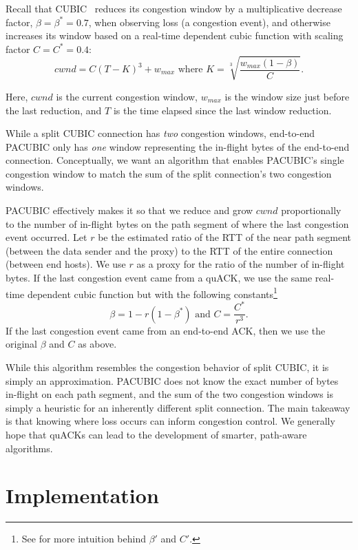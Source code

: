 Recall that CUBIC~\cite{ha2008cubic} reduces its congestion window by a
multiplicative decrease factor,
$\beta = \beta^* = 0.7$, when observing loss (a congestion event), and otherwise increases
its window based on a real-time dependent cubic function with scaling factor
$C=C^*=0.4$:
\[
cwnd = C(T-K)^3 + w_{max} \text{ where } K = \sqrt[3]{\frac{w_{max}(1-\beta)}{C}}.
\]

\noindent Here, $cwnd$ is the current congestion window,
$w_{max}$ is the window size just before the last reduction,
and $T$ is the time elapsed since the last window reduction.

While a split CUBIC connection has \emph{two} congestion windows,
end-to-end PACUBIC only has \emph{one} window representing the in-flight bytes
of the end-to-end connection.
Conceptually, we want an algorithm that enables PACUBIC's single
congestion window to match the sum of the split connection's two congestion
windows.

PACUBIC effectively makes it so that we reduce and grow $cwnd$
proportionally to the number of in-flight bytes on the path segment
of where the last congestion event occurred.
Let $r$ be the estimated ratio of the RTT of the near path segment
(between the data sender and the proxy) to the RTT of the entire connection
(between end hosts).
We use $r$ as a proxy for the ratio of the number of in-flight bytes.
If the last congestion event came from a quACK, we use the same real-time
dependent cubic function but with the following
constants\footnote{See  for more intuition behind $\beta'$ and $C'$.}
\[
\beta = 1 - r(1-\beta^*)\text{ and }C = \frac{C^*}{r^3}.
\]
\noindent If the last congestion event came from an end-to-end ACK, then we use
the original $\beta$ and $C$ as above.

While this algorithm resembles the congestion behavior of split CUBIC, it is
simply an approximation. PACUBIC does not know the exact number of bytes
in-flight on each path segment, and the sum of the two congestion windows is simply a
heuristic for an inherently different split connection. The main takeaway is
that knowing where loss occurs can inform congestion control. We generally
hope that quACKs can lead to the development of smarter, path-aware algorithms.

\section{Implementation}



